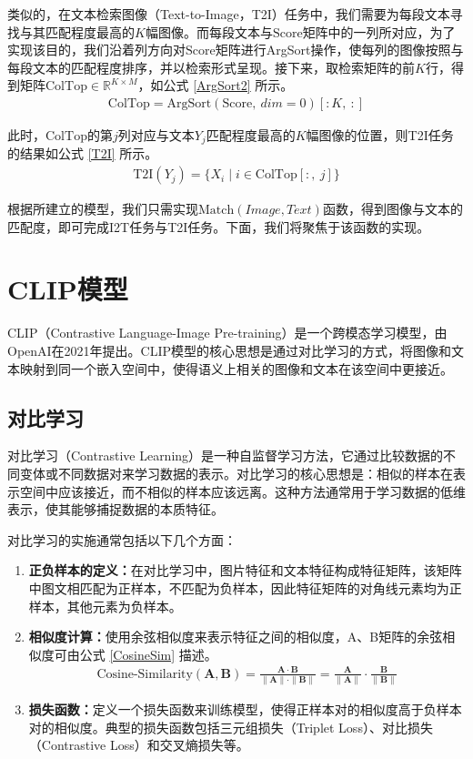 \documentclass[a4paper]{zreport}
\begin{document}
类似的，在文本检索图像（Text-to-Image，T2I）任务中，我们需要为每段文本寻找与其匹配程度最高的$K$幅图像。而每段文本与$\mathrm{Score}$矩阵中的一列所对应，为了实现该目的，我们沿着列方向对$\mathrm{Score}$矩阵进行ArgSort操作，使每列的图像按照与每段文本的匹配程度排序，并以检索形式呈现。接下来，取检索矩阵的前$K$行，得到矩阵$\mathrm{ColTop} \in \mathbb{R}^{K \times M}$，如公式 \eqref{ArgSort2} 所示。
\begin{gather}
\mathrm{ColTop} = \mathrm{ArgSort}\left(\mathrm{Score},~dim=0\right)\left[:K,~:\right]
\label{ArgSort2}
\end{gather}

此时，$\mathrm{ColTop}$的第$j$列对应与文本$Y_j$匹配程度最高的$K$幅图像的位置，则T2I任务的结果如公式 \eqref{T2I} 所示。
\begin{gather}
\mathrm{T2I}\left(Y_j\right) = \{X_i\mid i \in \mathrm{ColTop}\left[:,~j\right]\}\label{T2I}
\end{gather}

根据所建立的模型，我们只需实现$\mathrm{Match}\left(Image, Text\right)$函数，得到图像与文本的匹配度，即可完成I2T任务与T2I任务。下面，我们将聚焦于该函数的实现。

\section{CLIP模型}

CLIP（Contrastive Language-Image Pre-training）是一个跨模态学习模型\cite{clip}，由OpenAI在2021年提出。CLIP模型的核心思想是通过对比学习的方式，将图像和文本映射到同一个嵌入空间中，使得语义上相关的图像和文本在该空间中更接近。

\subsection{对比学习}

对比学习（Contrastive Learning）是一种自监督学习方法\cite{liu2021self}，它通过比较数据的不同变体或不同数据对来学习数据的表示。对比学习的核心思想是：相似的样本在表示空间中应该接近，而不相似的样本应该远离。这种方法通常用于学习数据的低维表示，使其能够捕捉数据的本质特征。

对比学习的实施通常包括以下几个方面：
\begin{enumerate}
\item \textbf{正负样本的定义：}在对比学习中，图片特征和文本特征构成特征矩阵，该矩阵中图文相匹配为正样本，不匹配为负样本，因此特征矩阵的对角线元素均为正样本，其他元素为负样本。
\item \textbf{相似度计算：}使用余弦相似度来表示特征之间的相似度，A、B矩阵的余弦相似度可由公式 \eqref{CosineSim} 描述。
\begin{gather}
\text{Cosine-Similarity}(\mathbf{A}, \mathbf{B})
= {\frac{\mathbf{A} \cdot \mathbf{B}} {\| \mathbf{A} \| \cdot \| \mathbf{B} \|}}
= \frac{\mathbf{A}}{\| \mathbf{A} \|} \cdot \frac{\mathbf{B}}{\| \mathbf{B} \|}
\label{CosineSim}
\end{gather}
\item \textbf{损失函数：}定义一个损失函数来训练模型，使得正样本对的相似度高于负样本对的相似度。典型的损失函数包括三元组损失（Triplet Loss）、对比损失（Contrastive Loss）和交叉熵损失等。
\end{enumerate}
\end{document}

